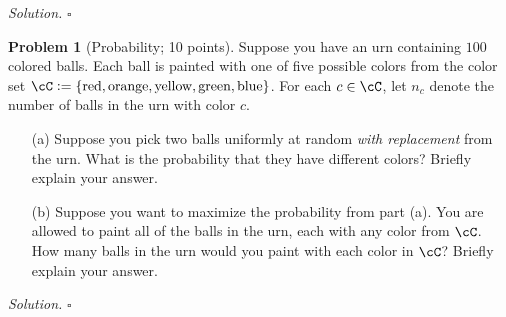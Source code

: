 \documentclass[11pt]{article}
\newcommand\braces[1]{\{#1\}}
\theoremstyle{definition}
\newtheorem{problem}{Problem}
\newenvironment{solution}{\noindent\emph{Solution.}}{\hfill$\square$}
\begin{document}
\begin{solution}
\end{solution}

\newpage


\begin{problem}[Probability; 10 points]
  Suppose you have an urn containing $100$ colored balls.
  Each ball is painted with one of five possible colors from the color
  set $\cC := \braces{ \text{red}, \text{orange}, \text{yellow},
  \text{green}, \text{blue} }$.
  For each $c \in \cC$, let $n_c$ denote the number of balls in the
  urn with color $c$.
  \begin{enumerate}
    \item[(a)]
      Suppose you pick two balls uniformly at random \emph{with replacement}
      from the urn.
      What is the probability that they have different colors?
      Briefly explain your answer.

    \item[(b)]
      Suppose you want to maximize the probability from part (a).
      You are allowed to paint all of the balls in the urn, each with any color
      from $\cC$.
      How many balls in the urn would you paint with each color in $\cC$?
      Briefly explain your answer.

  \end{enumerate}

\end{problem}

\begin{solution}
\end{solution}



\end{document}
